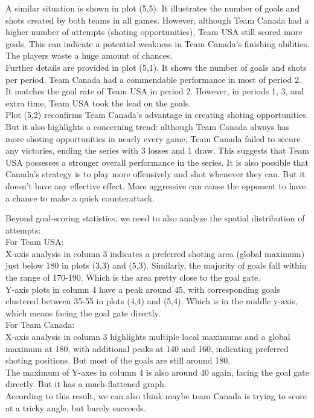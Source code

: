 \documentclass[
  a3paper,
]{article}
\begin{document}
A similar situation is shown in plot (5,5). It illustrates the number of
goals and shots created by both teams in all games. However, although
Team Canada had a higher number of attempts (shoting opportunities),
Team USA still scored more goals. This can indicate a potential weakness
in Team Canada's finishing abilities. The players waste a huge amount of
chances.\\

Further details are provided in plot (5,1). It shows the number of goals
and shots per period. Team Canada had a commendable performance in most
of period 2. It matches the goal rate of Team USA in period 2. However,
in periods 1, 3, and extra time, Team USA took the lead on the goals.\\

Plot (5,2) reconfirms Team Canada's advantage in creating shoting
opportunities. But it also highlights a concerning trend: although Team
Canada always has more shoting opportunities in nearly every game, Team
Canada failed to secure any victories, ending the series with 3 losses
and 1 draw. This suggests that Team USA possesses a stronger overall
performance in the series. It is also possible that Canada's strategy is
to play more offensively and shot whenever they can. But it doesn't have
any effective effect. More aggressive can cause the opponent to have a
chance to make a quick counterattack.~

Beyond goal-scoring statistics, we need to also analyze the spatial
distribution of attempts:\\

For Team USA:\\

X-axis analysis in column 3 indicates a preferred shoting area (global
maximum) just below 180 in plots (3,3) and (5,3). Similarly, the
majority of goals fall within the range of 170-190. Which is the area
pretty close to the goal gate.\\
Y-axis plots in column 4 have a peak around 45, with corresponding goals
clustered between 35-55 in plots (4,4) and (5,4). Which is in the middle
y-axis, which means facing the goal gate directly.\\

For Team Canada:\\

X-axis analysis in column 3 highlights multiple local maximums and a
global maximum at 180, with additional peaks at 140 and 160, indicating
preferred shoting positions. But most of the goals are still around
180.\\
The maximum of Y-axes in column 4 is also around 40 again, facing the
goal gate directly. But it has a much-flattened graph.\\
According to this result, we can also think maybe team Canada is trying
to score at a tricky angle, but barely succeeds.\\
\end{document}
